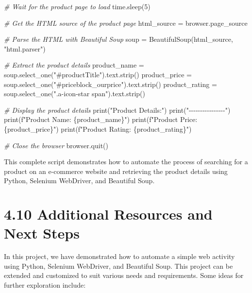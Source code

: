 \documentclass[
  paper=a4,
  ,captions=tableheading
]{scrartcl}
\newenvironment{Shaded}{}{}
\newcommand{\BuiltInTok}[1]{\textcolor[rgb]{0.00,0.50,0.00}{#1}}
\newcommand{\CommentTok}[1]{\textcolor[rgb]{0.38,0.63,0.69}{\textit{#1}}}
\newcommand{\DecValTok}[1]{\textcolor[rgb]{0.25,0.63,0.44}{#1}}
\newcommand{\NormalTok}[1]{#1}
\newcommand{\OperatorTok}[1]{\textcolor[rgb]{0.40,0.40,0.40}{#1}}
\newcommand{\SpecialCharTok}[1]{\textcolor[rgb]{0.25,0.44,0.63}{#1}}
\newcommand{\SpecialStringTok}[1]{\textcolor[rgb]{0.73,0.40,0.53}{#1}}
\newcommand{\StringTok}[1]{\textcolor[rgb]{0.25,0.44,0.63}{#1}}
\begin{document}
\begin{Shaded}
\begin{Highlighting}[]
\CommentTok{\# Wait for the product page to load}
\NormalTok{time.sleep(}\DecValTok{5}\NormalTok{)}

\CommentTok{\# Get the HTML source of the product page}
\NormalTok{html\_source }\OperatorTok{=}\NormalTok{ browser.page\_source}

\CommentTok{\# Parse the HTML with Beautiful Soup}
\NormalTok{soup }\OperatorTok{=}\NormalTok{ BeautifulSoup(html\_source, }\StringTok{"html.parser"}\NormalTok{)}

\CommentTok{\# Extract the product details}
\NormalTok{product\_name }\OperatorTok{=}\NormalTok{ soup.select\_one(}\StringTok{"\#productTitle"}\NormalTok{).text.strip()}
\NormalTok{product\_price }\OperatorTok{=}\NormalTok{ soup.select\_one(}\StringTok{"\#priceblock\_ourprice"}\NormalTok{).text.strip()}
\NormalTok{product\_rating }\OperatorTok{=}\NormalTok{ soup.select\_one(}\StringTok{".a{-}icon{-}star span"}\NormalTok{).text.strip()}

\CommentTok{\# Display the product details}
\BuiltInTok{print}\NormalTok{(}\StringTok{"Product Details:"}\NormalTok{)}
\BuiltInTok{print}\NormalTok{(}\StringTok{"{-}{-}{-}{-}{-}{-}{-}{-}{-}{-}{-}{-}{-}{-}{-}{-}"}\NormalTok{)}
\BuiltInTok{print}\NormalTok{(}\SpecialStringTok{f"Product Name: }\SpecialCharTok{\{}\NormalTok{product\_name}\SpecialCharTok{\}}\SpecialStringTok{"}\NormalTok{)}
\BuiltInTok{print}\NormalTok{(}\SpecialStringTok{f"Product Price: }\SpecialCharTok{\{}\NormalTok{product\_price}\SpecialCharTok{\}}\SpecialStringTok{"}\NormalTok{)}
\BuiltInTok{print}\NormalTok{(}\SpecialStringTok{f"Product Rating: }\SpecialCharTok{\{}\NormalTok{product\_rating}\SpecialCharTok{\}}\SpecialStringTok{"}\NormalTok{)}

\CommentTok{\# Close the browser}
\NormalTok{browser.quit()}
\end{Highlighting}
\end{Shaded}

This complete script demonstrates how to automate the process of
searching for a product on an e-commerce website and retrieving the
product details using Python, Selenium WebDriver, and Beautiful Soup.

\hypertarget{additional-resources-and-next-steps}{%
\section{4.10 Additional Resources and Next
Steps}\label{additional-resources-and-next-steps}}

In this project, we have demonstrated how to automate a simple web
activity using Python, Selenium WebDriver, and Beautiful Soup. This
project can be extended and customized to suit various needs and
requirements. Some ideas for further exploration include:
\end{document}
